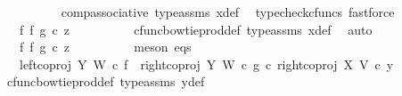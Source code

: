 \begin{isabellebody}
\ \ \ \ \ \ \ \ \isamarkupfalse%
\ comp{\isacharunderscore}{\kern0pt}associative{}\ type{\isacharunderscore}{\kern0pt}assms{\isacharparenleft}{\kern0pt}{}{\isacharcomma}{\kern0pt}{}{\isacharparenright}{\kern0pt}\ x{}{\isacharunderscore}{\kern0pt}def\ \isamarkupfalse%
\ {\isacharparenleft}{\kern0pt}typecheck{\isacharunderscore}{\kern0pt}cfuncs{\isacharcomma}{\kern0pt}\ fastforce{\isacharparenright}{\kern0pt}\isanewline
\ \ \ \ \ \ \isamarkupfalse%
\ \isamarkupfalse%
\ {\isachardoublequoteopen}{\isachardot}{\kern0pt}{\isachardot}{\kern0pt}{\isachardot}{\kern0pt}\ {\isacharequal}{\kern0pt}\ {\isacharparenleft}{\kern0pt}f\ {\isasymbowtie}\isactrlsub f\ g{\isacharparenright}{\kern0pt}\ {\isasymcirc}\isactrlsub c\ z{}{\isachardoublequoteclose}\isanewline
\ \ \ \ \ \ \ \ \isamarkupfalse%
\ cfunc{\isacharunderscore}{\kern0pt}bowtie{\isacharunderscore}{\kern0pt}prod{\isacharunderscore}{\kern0pt}def{}\ type{\isacharunderscore}{\kern0pt}assms\ x{}{\isacharunderscore}{\kern0pt}def\ \isamarkupfalse%
\ auto\isanewline
\ \ \ \ \ \ \isamarkupfalse%
\ \isamarkupfalse%
\ {\isachardoublequoteopen}{\isachardot}{\kern0pt}{\isachardot}{\kern0pt}{\isachardot}{\kern0pt}\ {\isacharequal}{\kern0pt}\ {\isacharparenleft}{\kern0pt}f\ {\isasymbowtie}\isactrlsub f\ g{\isacharparenright}{\kern0pt}\ {\isasymcirc}\isactrlsub c\ z{}{\isachardoublequoteclose}\isanewline
\ \ \ \ \ \ \ \ \isamarkupfalse%
\ {\isacharparenleft}{\kern0pt}meson\ eqs{\isacharparenright}{\kern0pt}\isanewline
\ \ \ \ \ \ \isamarkupfalse%
\ \isamarkupfalse%
\ {\isachardoublequoteopen}{\isachardot}{\kern0pt}{\isachardot}{\kern0pt}{\isachardot}{\kern0pt}\ {\isacharequal}{\kern0pt}\ {\isacharparenleft}{\kern0pt}{\isacharparenleft}{\kern0pt}left{\isacharunderscore}{\kern0pt}coproj\ Y\ W\ {\isasymcirc}\isactrlsub c\ f{\isacharparenright}{\kern0pt}\ {\isasymamalg}\ {\isacharparenleft}{\kern0pt}right{\isacharunderscore}{\kern0pt}coproj\ Y\ W\ {\isasymcirc}\isactrlsub c\ g{\isacharparenright}{\kern0pt}{\isacharparenright}{\kern0pt}\ {\isasymcirc}\isactrlsub c\ right{\isacharunderscore}{\kern0pt}coproj\ X\ V\ {\isasymcirc}\isactrlsub c\ y{}{\isachardoublequoteclose}\isanewline
\ \ \ \ \ \ \ \ \isamarkupfalse%
\ cfunc{\isacharunderscore}{\kern0pt}bowtie{\isacharunderscore}{\kern0pt}prod{\isacharunderscore}{\kern0pt}def{}\ type{\isacharunderscore}{\kern0pt}assms\ y{}{\isacharunderscore}{\kern0pt}def\ \isamarkupfalse%

\end{isabellebody}

